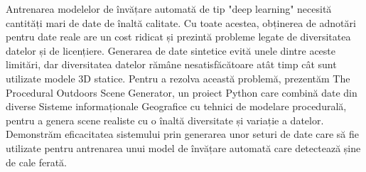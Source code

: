 Antrenarea modelelor de învățare automată de tip "deep learning" necesită cantități mari de date de înaltă calitate.
Cu toate acestea, obținerea de adnotări pentru
date reale are un cost ridicat și prezintă probleme legate de diversitatea datelor și de licențiere.
Generarea de date sintetice evită unele dintre aceste limitări, 
dar diversitatea datelor rămâne nesatisfăcătoare atât timp cât
sunt utilizate modele 3D statice. Pentru a rezolva această problemă, prezentăm The Procedural
Outdoors Scene Generator, un proiect Python care combină date din diverse 
Sisteme informaționale Geografice cu tehnici de modelare procedurală, pentru a genera scene realiste cu o înaltă
diversitate și variație a datelor. Demonstrăm eficacitatea sistemului prin generarea unor seturi de date care
să fie utilizate pentru antrenarea unui model de învățare automată care detectează șine de cale ferată.